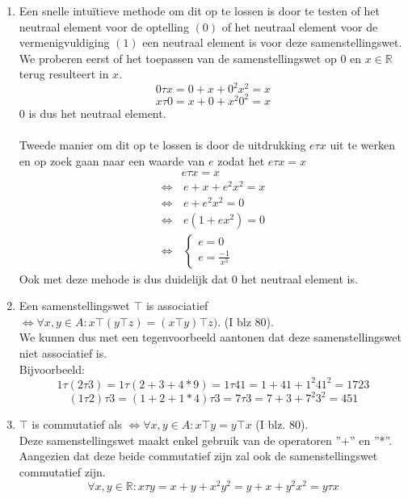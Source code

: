 \documentclass[11pt,a4paper,titlepage]{article}
\begin{document}
\begin{enumerate}[label=(\alph*)]
\item Een snelle intuïtieve methode om dit op te lossen is door te testen of het neutraal element voor de optelling $(0)$ of het neutraal element voor de vermenigvuldiging $(1)$ een neutraal element is voor deze samenstellingswet.
\\ We proberen eerst of het toepassen van de samenstellingswet op $0$ en $x \in \mathbb{R}$ terug resulteert in $x$.
    $$0\tau x = 0+x+0^2 x^2 = x$$
    $$x\tau 0 = x+0+x^2 0^2 = x$$
$0$ is dus het neutraal element.\\ \\
Tweede manier om dit op te lossen is door de uitdrukking $ e \tau x$ uit te werken en op zoek gaan naar een waarde van $e$ zodat het $e\tau x = x$
\begin{align*} 
&e\tau x = x \\
\Leftrightarrow  &\, e + x + e^2 x^2 = x\\
\Leftrightarrow  &\, e + e^2 x^2 = 0\\
\Leftrightarrow  &\, e (1 + e x^2) = 0\\
\Leftrightarrow  &\, 
\begin{cases}
	e = 0 \\
	e = \frac{-1}{x^2}
\end{cases}
\end{align*}
Ook met deze mehode is dus duidelijk dat $0$ het neutraal element is.


\item Een samenstellingswet $\top$ is associatief $\Leftrightarrow \forall x,y \in A: x\top (y \top z) = (x \top y) \top z)$. (I blz 80).\\
We kunnen dus met een tegenvoorbeeld aantonen dat deze samenstellingswet niet associatief is.\\
Bijvoorbeeld:
    $$1\tau (2 \tau 3) = 1 \tau (2 + 3 + 4*9) = 1 \tau 41 = 1 + 41 + 1^2 41^2 = 1723 $$
    $$(1\tau 2) \tau 3 = (1 + 2 + 1*4) \tau 3 = 7 \tau 3 = 7 + 3 + 7^2 3^2 = 451$$
\item $\top$ is commutatief als $\Leftrightarrow \forall x,y \in A: x \top y  = y \top x $ (I blz. 80). \\
Deze samenstellingswet maakt enkel gebruik van de operatoren ''+'' en ''*''. Aangezien dat deze beide commutatief zijn zal ook de samenstellingswet commutatief zijn. \\
	$$\forall x,y \in \mathbb{R}: x\tau y = x+y+x^2 y^2 = y+x+y^2 x^2 = y\tau x$$
\end{enumerate}
\end{document}
